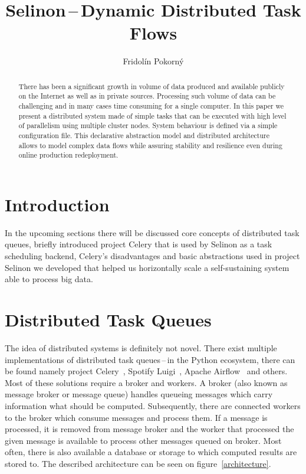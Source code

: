 \documentclass[a4paper]{llncs}
\begin{document}
%
\title{Selinon\,--\,Dynamic Distributed Task Flows}
%
%
\author{Fridol\'in Pokorn\'y}


\maketitle
\begin{abstract}
There has been a significant growth in volume of data produced and available publicly on the Internet as well as in private sources. Processing such volume of data can be challenging and in many cases time consuming for a single computer. In this paper we present a distributed system made of simple tasks that can be executed with high level of parallelism using multiple cluster nodes. System behaviour is defined via a simple configuration file. This declarative abstraction model and distributed architecture allows to model complex data flows while assuring stability and resilience even during online production redeployment.
\end{abstract}

\section{Introduction}

In the upcoming sections there will be discussed core concepts of distributed task queues, briefly introduced project Celery that is used by Selinon as a task scheduling backend, Celery's disadvantages and basic abstractions used in project Selinon we developed that helped us horizontally scale a self-sustaining system able to process big data.

\section{Distributed Task Queues} \label{section_distributed_task_queues}

The idea of distributed systems is definitely not novel. There exist multiple implementations of distributed task queues\,--\,in the Python ecosystem, there can be found namely project Celery~\cite{ref_celery}, Spotify Luigi~\cite{ref_luigi}, Apache Airflow~\cite{ref_airflow} and others. Most of these solutions require a broker and workers. A broker (also known as message broker or message queue) handles queueing messages which carry information what should be computed. Subsequently, there are connected workers to the broker which consume messages and process them. If a message is processed, it is removed from message broker and the worker that processed the given message is available to process other messages queued on broker. Most often, there is also available a database or storage to which computed results are stored to. The described architecture can be seen on figure~\ref{architecture}.
\end{document}
